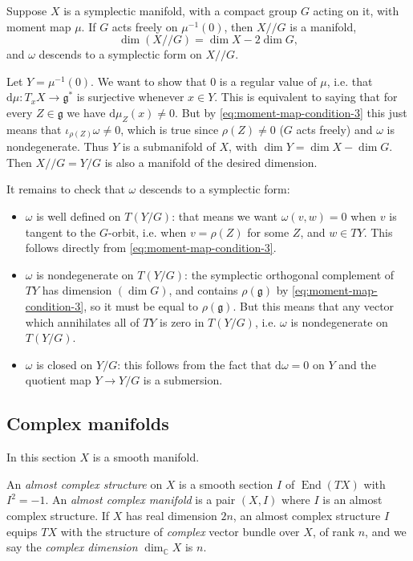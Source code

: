 \documentclass[12pt,letterpaper,reqno]{article}
\numberwithin{equation}{section}
\newcommand{\fg}{{\mathfrak g}}
\newcommand{\C}{\ensuremath{\mathbb C}}
\newcommand{\kq}{/\!\!/}
\newcommand{\de}{\mathrm{d}}
\newcommand{\ti}[1]{\textit{#1}}
\DeclareMathOperator{\End}{End}
\begin{document}
\begin{prop}
Suppose $X$ is a symplectic manifold, with a compact group $G$
acting on it, with moment map $\mu$.
If $G$ acts freely
on $\mu^{-1}(0)$, then $X \kq G$ is a manifold,
\begin{equation}
  \dim (X \kq G) = \dim X - 2 \dim G,
\end{equation}
and $\omega$ descends to a symplectic form on $X \kq G$.
\end{prop}
\begin{pf}
Let $Y = \mu^{-1}(0)$.
We want to show that $0$ is a regular value of $\mu$,
i.e. that $\de \mu: T_x X \to \fg^*$ is surjective
whenever $x \in Y$. This 
is equivalent to saying that for every $Z \in \fg$
we have $\de \mu_Z(x) \neq 0$.
But by \eqref{eq:moment-map-condition-3} this just means
that $\iota_{\rho(Z)} \omega \neq 0$,
which is true since $\rho(Z) \neq 0$ ($G$ acts freely)
and $\omega$ is nondegenerate.
Thus $Y$ is a submanifold of $X$,
with $\dim Y = \dim X - \dim G$.
Then $X \kq G = Y / G$ is also a manifold of the desired 
dimension.

It remains to check that $\omega$ descends to a
symplectic form: 
\begin{itemize} 
\item $\omega$ is well defined
on $T(Y/G)$: that means we want $\omega(v,w) = 0$
when $v$ is tangent to the $G$-orbit, i.e. when $v = \rho(Z)$
for some $Z$, and $w \in TY$. This follows directly from
\eqref{eq:moment-map-condition-3}.
\item $\omega$ is nondegenerate on $T(Y/G)$:
the symplectic orthogonal complement of $TY$ has dimension
$(\dim G)$, and contains $\rho(\fg)$ by
\eqref{eq:moment-map-condition-3}, so it must be equal
to $\rho(\fg)$. But this means that any vector which
annihilates all of $TY$ is zero in $T(Y/G)$, i.e.
$\omega$ is nondegenerate on $T(Y/G)$.
\item $\omega$ is closed on $Y/G$: this follows 
from the fact that $\de \omega = 0$ on $Y$ and the
quotient map $Y \to Y/G$ is a submersion.
\end{itemize}
\end{pf}


\subsection{Complex manifolds} 
In this section $X$ is a smooth manifold.

\begin{defn}
An \ti{almost complex structure} on $X$ is a smooth section $I$ of $\End(TX)$ with $I^2 = -1$. An \ti{almost complex manifold} is a pair $(X,I)$ where $I$ is an almost complex structure.
If $X$ has real dimension $2n$, an almost complex
structure $I$ equips $TX$ with the structure of
\ti{complex} vector bundle over $X$, of rank $n$,
and we say the \ti{complex dimension} $\dim_\C X$ is
$n$.
\end{defn}
\end{document}

